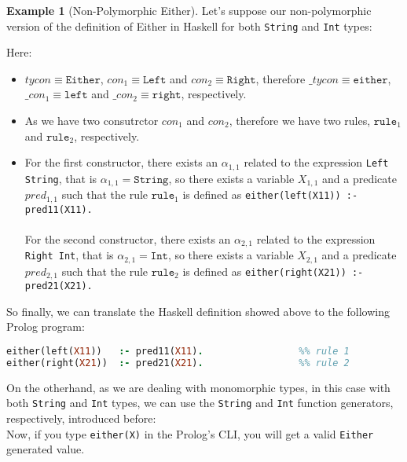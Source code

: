 \documentclass{report}
\theoremstyle{definition}
\newtheorem{example}{Example}[section]
\theoremstyle{definition}
\newcommand{\ttt}[1]{\texttt{#1}}
\begin{document}
\begin{example}[Non-Polymorphic Either]
	Let's suppose our non-polymorphic version of the definition of Either in Haskell for both \ttt{String} and \ttt{Int} types:
	
	Here:
	\begin{itemize}
		\item $tycon \equiv \ttt{Either}$, $con_1 \equiv \ttt{Left}$ and $con_2 \equiv \ttt{Right}$, therefore $\_tycon \equiv \ttt{either}$, $\_con_1 \equiv \ttt{left}$ and $\_con_2 \equiv \ttt{right}$, respectively.
		\item As we have two consutrctor $con_1$ and $con_2$, therefore we have two rules, $\ttt{rule}_1$ and $\ttt{rule}_2$, respectively.
		\item For the first constructor, there exists an $\alpha_{1,1}$ related to the expression \ttt{Left String}, that is $\alpha_{1,1} = \ttt{String}$, so there exists a variable $X_{1,1}$ and a predicate $pred_{1,1}$ such that the rule $\ttt{rule}_1$ is defined as \ttt{either(left(X11)) :- pred11(X11).}\\\\
		For the second constructor, there exists an $\alpha_{2,1}$ related to the expression \ttt{Right Int}, that is $\alpha_{2,1} = \ttt{Int}$, so there exists a variable $X_{2,1}$ and a predicate $pred_{2,1}$ such that the rule $\ttt{rule}_2$ is defined as \ttt{either(right(X21)) :- pred21(X21).}
	\end{itemize}
	So finally, we can translate the Haskell definition showed above to the following Prolog program:\\
\begin{lstlisting}[language=Prolog]
either(left(X11)) 	:- pred11(X11).					%% rule 1
either(right(X21)) 	:- pred21(X21).					%% rule 2
\end{lstlisting}
On the otherhand, as we are dealing with monomorphic types, in this case with both \ttt{String} and \ttt{Int} types, we can use the \ttt{String} and \ttt{Int} function generators, respectively, introduced before:\\

Now, if you type \ttt{either(X)} in the Prolog's CLI, you will get a valid \ttt{Either} generated value.\\
\end{example}
\end{document}
